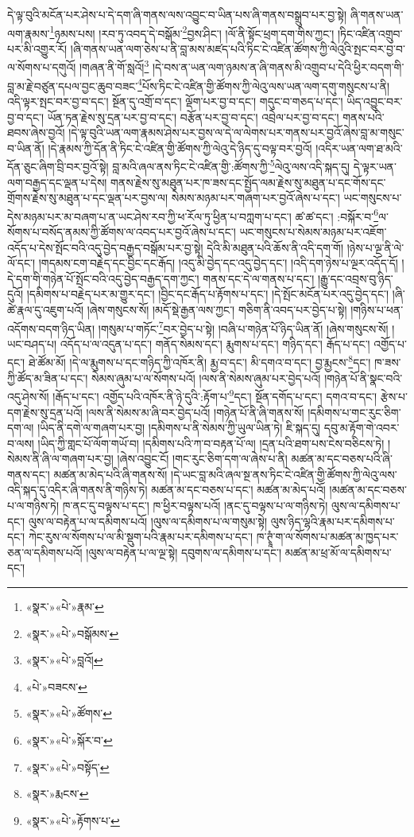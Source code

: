 དེ་ལྟ་བུའི་མངོན་པར་ཤེས་པ་དེ་དག་ཞི་གནས་ལས་འབྱུང་བ་ཡིན་པས་ཞི་གནས་བསྒྲུབ་པར་བྱ་སྟེ། ཞི་གནས་ཡན་ལག་རྣམས་\footnote{«སྣར་»«པེ་»རྣམ་}ཉམས་པས། །རབ་ཏུ་འབད་དེ་བསྒོམ་\footnote{«སྣར་»«པེ་»བསྒོམས་}བྱས་ཤིང་། །ལོ་ནི་སྟོང་ཕྲག་དག་གིས་ཀྱང་། །ཏིང་འཛིན་འགྲུབ་པར་མི་འགྱུར་རོ། །ཞི་གནས་ཡན་ལག་ཅེས་པ་ནི་བླ་མས་མཛད་པའི་ཏིང་ངེ་འཛིན་ཚོགས་ཀྱི་ལེའུའི་སྤང་བར་བྱ་བ་ལ་སོགས་པ་དགུའོ། །གཞན་ནི་གོ་སླའོ།\footnote{«སྣར་»«པེ་»བླའོ།} །དེ་བས་ན་ཡན་ལག་ཉམས་ན་ཞི་གནས་མི་འགྲུབ་པ་དེའི་ཕྱིར་བདག་གི་བླ་མ་རྗེ་བཙུན་དཔལ་བྱང་ཆུབ་བཟང་\footnote{«པེ་»བཟངས་}པོས་ཏིང་ངེ་འཛིན་གྱི་ཚོགས་ཀྱི་ལེའུ་ལས་ཡན་ལག་དགུ་གསུངས་པ་ནི། འདི་ལྟར་སྤང་བར་བྱ་བ་དང་། སྔོན་དུ་འགྲོ་བ་དང་། ལྡོག་པར་བྱ་བ་དང་། གདུང་བ་གཅད་པ་དང་། ཡིད་འབྱུང་བར་བྱ་བ་དང་། ཡོན་ཏན་རྗེས་སུ་དྲན་པར་བྱ་བ་དང་། བརྩོན་པར་བྱ་བ་དང་། འབྲེལ་པར་བྱ་བ་དང་། གནས་པའི་ཐབས་ཞེས་བྱའོ། །དེ་ལྟ་བུའི་ཡན་ལག་རྣམས་ཤེས་པར་བྱས་ལ་དེ་ལ་ལེགས་པར་གནས་པར་བྱའོ་ཞེས་བླ་མ་གསུང་བ་ཡིན་ནོ། །དེ་རྣམས་ཀྱི་དོན་ནི་ཏིང་ངེ་འཛིན་གྱི་ཚོགས་ཀྱི་ལེའུ་དེ་ཉིད་དུ་བལྟ་བར་བྱའོ། །འདིར་ཡན་ལག་ཐ་མའི་དོན་ཅུང་ཞིག་བྲི་བར་བྱའོ་སྟེ། བླ་མའི་ཞལ་ནས་ཏིང་ངེ་འཛིན་གྱི་:ཚོགས་ཀྱི་\footnote{«སྣར་»«པེ་»ཚོགས་}ལེའུ་ལས་འདི་སྐད་དུ། དེ་ལྟར་ཡན་ལག་བརྒྱད་དང་ལྡན་པ་དེས། གནས་རྗེས་སུ་མཐུན་པར་ཁ་ཟས་དང་སྤྱོད་ལམ་རྗེས་སུ་མཐུན་པ་དང་གོས་དང་གྲོགས་རྗེས་སུ་མཐུན་པ་དང་ལྡན་པར་བྱས་ལ། སེམས་མཉམ་པར་གཞག་པར་བྱའོ་ཞེས་པ་དང་། ཡང་གསུངས་པ་དེས་མཉམ་པར་མ་བཞག་པ་ན་ཡང་ཤེས་རབ་ཀྱི་ཕ་རོལ་ཏུ་ཕྱིན་པ་བཀླག་པ་དང་། ཚ་ཚ་དང་། :བསྐོར་བ་\footnote{«སྣར་»«པེ་»སྐོར་བ་}ལ་སོགས་པ་བསོད་ནམས་ཀྱི་ཚོགས་ལ་འབད་པར་བྱའོ་ཞེས་པ་དང་། ཡང་གསུངས་པ་སེམས་མཉམ་པར་འཇོག་འདོད་པ་དེས་སྤོང་བའི་འདུ་བྱེད་བརྒྱད་བསྒོམ་པར་བྱ་སྟེ། དེའི་མི་མཐུན་པའི་ཆོས་ནི་འདི་དག་གོ། །ཉེས་པ་ལྔ་ནི་ལེ་ལོ་དང་། །གདམས་ངག་བརྗེད་དང་བྱིང་དང་རྒོད། །འདུ་མི་བྱེད་དང་འདུ་བྱེད་དང་། །འདི་དག་ཉེས་པ་ལྔར་འདོད་དོ། །དེ་དག་གི་གཉེན་པོ་སྤོང་བའི་འདུ་བྱེད་བརྒྱད་དག་ཀྱང་། གནས་དང་དེ་ལ་གནས་པ་དང་། །རྒྱུ་དང་འབྲས་བུ་ཉིད་དུའོ། །དམིགས་པ་བརྗེད་པར་མ་གྱུར་དང་། །བྱིང་དང་རྒོད་པ་རྟོགས་པ་དང་། །དེ་སྤོང་མངོན་པར་འདུ་བྱེད་དང་། །ཞི་ཚེ་རྣལ་དུ་འཇུག་པའོ། །ཞེས་གསུངས་སོ། །མདོ་སྡེ་རྒྱན་ལས་ཀྱང་། གཅིག་ནི་འབད་པར་བྱེད་པ་སྟེ། །གཉིས་པ་ཕན་འདོགས་བདག་ཉིད་ཡིན། །གསུམ་པ་གཏོང་\footnote{«སྣར་»«པེ་»བསྟོད་}བར་བྱེད་པ་སྟེ། །བཞི་པ་གཉེན་པོ་ཉིད་ཡིན་ནོ། །ཞེས་གསུངས་སོ། །ཡང་བཤད་པ། འདོད་པ་ལ་འདུན་པ་དང་། གནོད་སེམས་དང་། རྨུགས་པ་དང་། གཉིད་དང་། རྒོད་པ་དང་། འགྱོད་པ་དང་། ཐེ་ཚོམ་མོ། །དེ་ལ་རྨུགས་པ་དང་གཉིད་ཀྱི་འཁོར་ནི། རྨྱ་བ་དང་། མི་དགའ་བ་དང་། བྱ་རྨྱངས་\footnote{«སྣར་»རྨངས་}དང་། ཁ་ཟས་ཀྱི་ཚོད་མ་ཟིན་པ་དང་། སེམས་ཞུམ་པ་ལ་སོགས་པའོ། །ལས་ནི་སེམས་ཞུམ་པར་བྱེད་པའོ། །གཉེན་པོ་ནི་སྣང་བའི་འདུ་ཤེས་སོ། །རྒོད་པ་དང་། འགྱོད་པའི་འཁོར་ནི་ཉེ་དུའི་:རྟོག་པ་\footnote{«སྣར་»«པེ་»རྟོགས་པ་}དང་། སྔོན་དགོད་པ་དང་། དགའ་བ་དང་། རྩེས་པ་དག་རྗེས་སུ་དྲན་པའོ། །ལས་ནི་སེམས་མ་ཞི་བར་བྱེད་པའོ། །གཉེན་པོ་ནི་ཞི་གནས་སོ། །དམིགས་པ་གང་རུང་ཅིག་དག་ལ། །ཡིད་ནི་དགེ་ལ་གཞག་པར་བྱ། །དམིགས་པ་ནི་སེམས་ཀྱི་ཡུལ་ཡིན་ཏེ། ཇི་སྐད་དུ། དབུ་མ་རྟོག་གེ་འབར་བ་ལས། །ཡིད་ཀྱི་གླང་པོ་ལོག་གཡོ་བ། །དམིགས་པའི་ཀ་བ་བརྟན་པོ་ལ། །དྲན་པའི་ཐག་པས་ངེས་བཅིངས་ཏེ། །སེམས་ནི་ཞི་ལ་གཞག་པར་བྱ། །ཞེས་འབྱུང་ངོ། །གང་རུང་ཅིག་དག་ལ་ཞེས་པ་ནི། མཚན་མ་དང་བཅས་པའི་ཞི་གནས་དང་། མཚན་མ་མེད་པའི་ཞི་གནས་སོ། །དེ་ཡང་བླ་མའི་ཞལ་སྔ་ནས་ཏིང་ངེ་འཛིན་གྱི་ཚོགས་ཀྱི་ལེའུ་ལས་འདི་སྐད་དུ་འདིར་ཞི་གནས་ནི་གཉིས་ཏེ། མཚན་མ་དང་བཅས་པ་དང་། མཚན་མ་མེད་པའོ། །མཚན་མ་དང་བཅས་པ་ལ་གཉིས་ཏེ། ཁ་ནང་དུ་བལྟས་པ་དང་། ཁ་ཕྱིར་བལྟས་པའོ། །ནང་དུ་བལྟས་པ་ལ་གཉིས་ཏེ། ལུས་ལ་དམིགས་པ་དང་། ལུས་ལ་བརྟེན་པ་ལ་དམིགས་པའོ། །ལུས་ལ་དམིགས་པ་ལ་གསུམ་སྟེ། ལུས་ཉིད་ལྷའི་རྣམ་པར་དམིགས་པ་དང་། ཀེང་རུས་ལ་སོགས་པ་ལ་མི་སྡུག་པའི་རྣམ་པར་དམིགས་པ་དང་། ཁ་ཊྭཱཾ་ག་ལ་སོགས་པ་མཚན་མ་ཁྱད་པར་ཅན་ལ་དམིགས་པའོ། །ལུས་ལ་བརྟེན་པ་ལ་ལྔ་སྟེ། དབུགས་ལ་དམིགས་པ་དང་། མཚན་མ་ཕྲ་མོ་ལ་དམིགས་པ་དང་། 